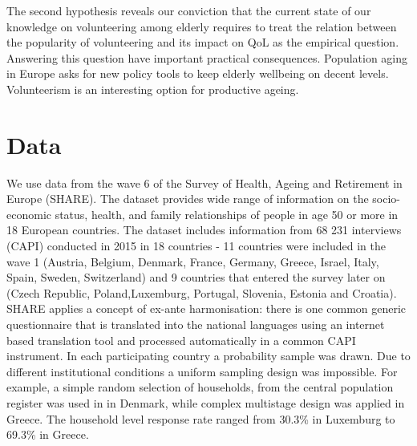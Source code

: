 \documentclass[10pt, letterpaper]{article}
\begin{document}
\begin{spacing}{1.4}
The second hypothesis reveals our conviction that the current state of our knowledge on volunteering among elderly requires to treat the relation between the popularity of volunteering and its impact on QoL as the empirical question. Answering this question have important practical consequences. Population aging in Europe asks for new policy tools to keep elderly wellbeing on decent levels. Volunteerism is an interesting option for productive ageing. 
 


\section{Data}

We use data from the wave 6 of the Survey of Health, Ageing and Retirement in Europe (SHARE). The dataset provides wide range of information on the socio-economic status, health, and family relationships of people in age 50 or more in 18 European countries. The dataset includes information from 68 231 interviews (CAPI) conducted in 2015 in 18 countries - 11 countries were included in the wave 1 (Austria, Belgium, Denmark, France, Germany, Greece, Israel, Italy, Spain, Sweden, Switzerland) and 9 countries that entered the survey later on (Czech Republic, Poland,Luxemburg,  Portugal, Slovenia, Estonia and Croatia). SHARE applies a concept of ex-ante harmonisation: there is one common generic questionnaire that is translated into the national languages using an internet based translation tool and processed automatically in a common CAPI instrument. In each participating country a probability sample was drawn. Due to different institutional conditions a uniform sampling design was impossible. For example, a simple random selection of households, from the central population register was used in in Denmark, while complex multistage design was applied in Greece. The  household level response rate ranged from 30.3\% in Luxemburg to 69.3\% in Greece. \citet{bergmann17} \\



\end{spacing}
\end{document}
